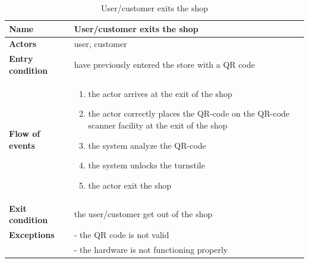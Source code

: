 \begin{table}[h!]
    \centering
    \begin{tabular}{@{}P{0.2\textwidth}P{0.70\textwidth}@{}}
        \toprule
        \textbf{Name}                 & User/customer exits the shop\\
        \midrule
        \textbf{Actors}               & user, customer\\
        \textbf{Entry condition}      & have previously entered the store with a QR code\\
        \textbf{Flow of events}       & 
        \begin{enumerate}[nolistsep, leftmargin=*]
            \item the actor arrives at the exit of the shop
            \item the actor correctly places the QR-code on the QR-code scanner facility at the exit of the shop
            \item the system analyze the QR-code
            \item the system unlocks the turnstile
            \item the actor exit the shop
        \end{enumerate} \\
        \textbf{Exit condition}       & the user/customer get out of the shop\\
        \textbf{Exceptions}           
        & - the QR code is not valid\\
        & - the hardware is not functioning properly\\
        \bottomrule
    \end{tabular}
\caption{User/customer exits the shop}
\label{table:exitshop}
\end{table}

